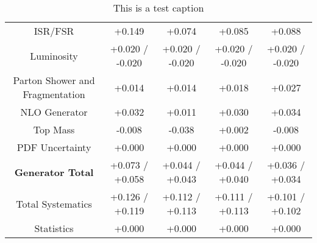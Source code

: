 \begin{table}[htbp]
\begin{center}
\begin{tabular}{|c|c|c|c|c|}
ISR/FSR                               &+0.149              & +0.074              & +0.085              & +0.088             \\
Luminosity                            &+0.020   / -0.020   & +0.020   / -0.020   & +0.020   / -0.020   & +0.020   / -0.020  \\
Parton Shower and Fragmentation       &+0.014              & +0.014              & +0.018              & +0.027             \\
NLO Generator                         &+0.032              & +0.011              & +0.030              & +0.034             \\
Top Mass                              &-0.008              & -0.038              & +0.002              & -0.008             \\
PDF Uncertainty                       &+0.000              & +0.000              & +0.000              & +0.000             \\
\hline
\textbf{Generator Total}              &+0.073   / +0.058   & +0.044   / +0.043   & +0.044   / +0.040   & +0.036   / +0.034  \\
\hline
\hline
Total Systematics                     &+0.126   / +0.119   & +0.112   / +0.113   & +0.111   / +0.113   & +0.101   / +0.102  \\
Statistics                            &+0.000              & +0.000              & +0.000              & +0.000             \\
\hline
  \end{tabular}
  \end{center} 
  \label{tab:xsec_nominal_sratio}
  \caption{This is a test caption}
\end{table}
 


\clearpage

